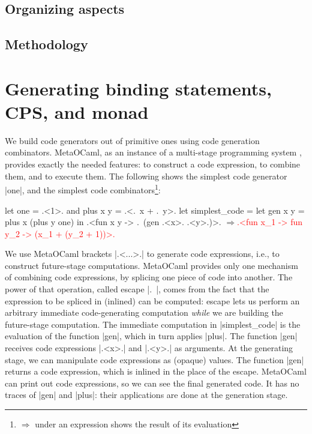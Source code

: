 \documentclass[draft]{elsart}
\newcommand{\evalresult}[1]{\ensuremath{\Longrightarrow}\textcolor{red}{#1}}
\begin{document}
\subsection{Organizing aspects}

\subsection{Methodology}

\section{Generating binding statements, CPS, and monad}\label{CPS}

We build code generators out of primitive ones using code generation 
combinators. MetaOCaml, as an instance of a multi-stage
programming system \cite{TahaThesis}, provides exactly the needed
features: to construct a code expression, to combine them, and to
execute them. The following shows the simplest code generator |one|,
and the simplest code combinators\footnote{%
$\Longrightarrow$ under an expression shows the result of its evaluation}:

\begin{code}
let one = .<1>. and plus x y = .<.~x + .~y>.
let simplest_code = let gen x y = plus x (plus y one) in
  .<fun x y -> .~(gen .<x>. .<y>.)>.
\evalresult{.<fun x_1 -> fun y_2 -> (x_1 + (y_2 + 1))>.}
\end{code}

We use MetaOCaml brackets |.<...>.| to generate code expressions,
i.e., to construct future-stage computations. MetaOCaml provides only
one mechanism of combining code expressions, by splicing one
piece of code into
another. The power of that operation, called escape |.~|, comes from
the fact that the expression to be spliced in (inlined) can be
computed: escape lets us perform an arbitrary immediate code-generating
computation \emph{while} we are
building the future-stage computation. The immediate computation in
|simplest_code| is the evaluation of the function |gen|, which in turn
applies |plus|. The function |gen| receives code expressions |.<x>.|
and |.<y>.| as arguments. At the generating stage, we can manipulate
code expressions as (opaque) values. The function |gen| returns a code
expression, which is inlined in the place of the escape. MetaOCaml can
print out code expressions, so we can see the final generated code. It
has no traces of |gen| and |plus|: their applications are done at the
generation stage.
\end{document}
